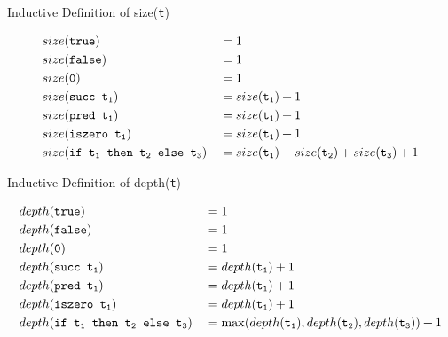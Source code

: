 \begin{frame}{Inductive Definition of size(\texttt{t})}
\begin{definition}
\begin{alignat*}{2}
  &size(\texttt{true}) &&= 1\\
  &size(\texttt{false}) &&= 1\\
  &size(\texttt{0}) &&= 1\\
  &size(\texttt{succ t\textsubscript{1}}) &&= size(\texttt{t\textsubscript{1}}) + 1\\
  &size(\texttt{pred t\textsubscript{1}}) &&= size(\texttt{t\textsubscript{1}}) + 1\\
  &size(\texttt{iszero t\textsubscript{1}}) &&= size(\texttt{t\textsubscript{1}}) + 1\\
  &size(\texttt{if t\textsubscript{1} then t\textsubscript{2} else t\textsubscript{3}}) &&= size(\texttt{t\textsubscript{1}}) + size(\texttt{t\textsubscript{2}}) + size(\texttt{t\textsubscript{3}}) + 1
\end{alignat*}
\end{definition}
\end{frame}

\begin{frame}{Inductive Definition of depth(\texttt{t})}
\begin{definition}
\begin{alignat*}{2}
  &depth(\texttt{true}) &&= 1\\
  &depth(\texttt{false}) &&= 1\\
  &depth(\texttt{0}) &&= 1\\
  &depth(\texttt{succ t\textsubscript{1}}) &&= depth(\texttt{t\textsubscript{1}}) + 1\\
  &depth(\texttt{pred t\textsubscript{1}}) &&= depth(\texttt{t\textsubscript{1}}) + 1\\
  &depth(\texttt{iszero t\textsubscript{1}}) &&= depth(\texttt{t\textsubscript{1}}) + 1\\
  &depth(\texttt{if t\textsubscript{1} then t\textsubscript{2} else t\textsubscript{3}}) &&= \max(depth(\texttt{t\textsubscript{1}}), depth(\texttt{t\textsubscript{2}}), depth(\texttt{t\textsubscript{3}})) + 1
\end{alignat*}
\end{definition}
\end{frame}

